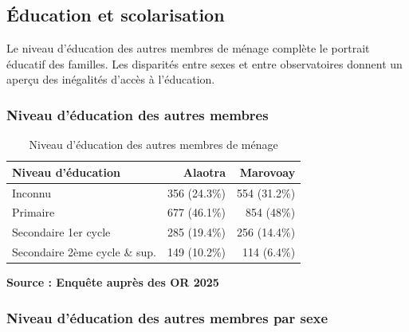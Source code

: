 \documentclass[
  french,
  letterpaper,
]{report}
\begin{document}
\subsection{Éducation et
scolarisation}\label{uxe9ducation-et-scolarisation}

Le niveau d'éducation des autres membres de ménage complète le portrait
éducatif des familles. Les disparités entre sexes et entre observatoires
donnent un aperçu des inégalités d'accès à l'éducation.

\subsubsection{Niveau d'éducation des autres
membres}\label{niveau-duxe9ducation-des-autres-membres}

\begin{table}
\caption*{
{\fontsize{20}{25}\selectfont  Niveau d'éducation des autres membres de ménage\fontsize{12}{15}\selectfont }
} 
\fontsize{12.0pt}{14.0pt}\selectfont
\begin{tabular*}{\linewidth}{@{\extracolsep{\fill}}lrr}
\toprule
Niveau d'éducation & {\bfseries {Alaotra}} & {\bfseries {Marovoay}} \\ 
\midrule\addlinespace[2.5pt]
Inconnu & 356 (24.3\%) & 554 (31.2\%) \\ 
Primaire & 677 (46.1\%) & 854 (48\%) \\ 
Secondaire 1er cycle & 285 (19.4\%) & 256 (14.4\%) \\ 
Secondaire 2ème cycle \& sup. & 149 (10.2\%) & 114 (6.4\%) \\ 
\bottomrule
\end{tabular*}
\begin{minipage}{\linewidth}
\textbf{Source : Enquête auprès des OR 2025}\\
\end{minipage}
\end{table}

\subsubsection{Niveau d'éducation des autres membres par
sexe}\label{niveau-duxe9ducation-des-autres-membres-par-sexe}
\end{document}
